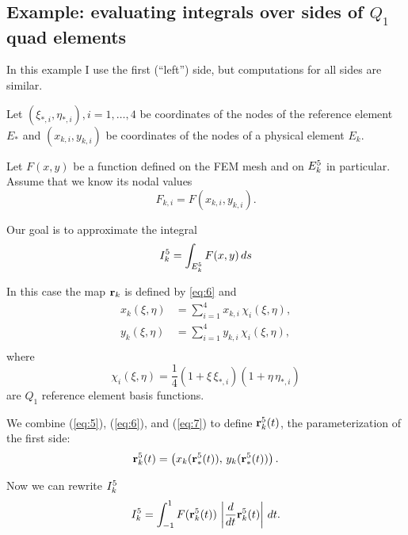 \documentclass[11pt]{article}
\begin{document}
\subsection{Example: evaluating integrals over sides of $Q_{1}$ quad elements}
\label{sec-3-1}

In this example I use the first (``left'') side, but computations for
all sides are similar.

Let $(\xi_{*,i}, \eta_{*,i}), i = 1,\dots,4$ be coordinates of the nodes
of the reference element $E_{*}$ and $(x_{k,i}, y_{k,i})$ be coordinates
of the nodes of a physical element $E_{k}$.

Let $F(x,y)$ be a function defined on the FEM mesh and on $E_{k}^{5}$ in
particular. Assume that we know its nodal values
\begin{equation}
\label{eq:10}
F_{k,i} = F(x_{k,i}, y_{k,i}).
\end{equation}

Our goal is to approximate the integral
\begin{equation}
\label{eq:11}
I_{k}^{5} = \int_{E_{k}^{5}} F(x,y)\, ds
\end{equation}

In this case the map $\mathbf{r}_{k}$ is defined by \eqref{eq:6} and
\begin{equation}
\label{eq:12}
\begin{aligned}
x_{k}(\xi,\eta) &= \sum_{i=1}^{4} x_{k,i}\, \chi_{i}(\xi, \eta),\\
y_{k}(\xi,\eta) &= \sum_{i=1}^{4} y_{k,i}\, \chi_{i}(\xi, \eta),\\
\end{aligned}
\end{equation}
where
\begin{equation}
\label{eq:13}
\chi_{i}(\xi,\eta) = \frac14 (1 + \xi\,\xi_{*,i})(1 + \eta\,\eta_{*,i})
\end{equation}
are $Q_{1}$ reference element basis functions.

We combine (\ref{eq:5}), (\ref{eq:6}), and (\ref{eq:7}) to define $\mathbf{r}_{k}^{5}(t)$, the parameterization of the first side:
\begin{equation}
  \label{eq:14}
  \mathbf{r}_{k}^{5}(t) = \left( x_{k}(\mathbf{r}_{*}^{5}(t)),\, y_{k}(\mathbf{r}_{*}^{5}(t)) \right).
\end{equation}

Now we can rewrite $I_{k}^{5}$
\begin{equation}
\label{eq:15}
I_{k}^{5} = \int_{-1}^{1} F(\mathbf{r}_{k}^{5}(t))\, \left|\frac{d}{dt}\mathbf{r}_{k}^{5}(t) \right|\, dt.
\end{equation}
\end{document}
